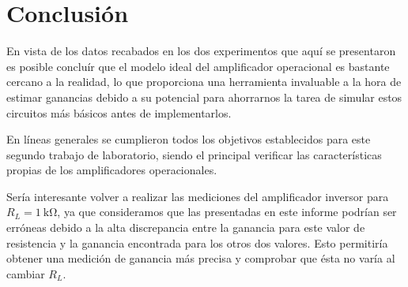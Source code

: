 \section{Conclusión}

En vista de los datos recabados en los dos experimentos que aquí se presentaron
es posible concluír que el modelo ideal del amplificador operacional es 
bastante cercano a la realidad, lo que proporciona una herramienta invaluable
a la hora de estimar ganancias debido a su potencial para ahorrarnos la tarea
de simular estos circuitos más básicos antes de implementarlos.

En líneas generales se cumplieron todos los objetivos establecidos para este
segundo trabajo de laboratorio, siendo el principal verificar las 
características propias de los amplificadores operacionales.

Sería interesante volver a realizar las mediciones del amplificador inversor
para $R_L = \SI{1}{\kilo\ohm}$, ya que consideramos que las presentadas en
este informe podrían ser erróneas debido a la alta discrepancia entre la 
ganancia para este valor de resistencia y la ganancia encontrada para los
otros dos valores. Esto permitiría obtener una medición de ganancia más
precisa y comprobar que ésta no varía al cambiar $R_L$. 
